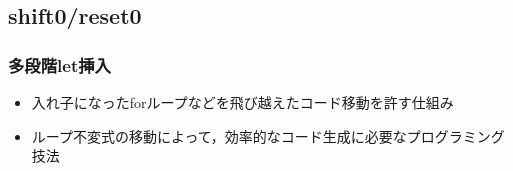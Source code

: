 

\subsection{shift0/reset0}

\begin{frame}
  \frametitle{多段階let挿入}

  \begin{itemize}
  \item 入れ子になったforループなどを飛び越えた\alert{コード移動}を許す仕組み
  \item ループ不変式の移動によって，\alert{効率的なコード生成}に必要なプログラミング技法
  \end{itemize}
\end{frame}

